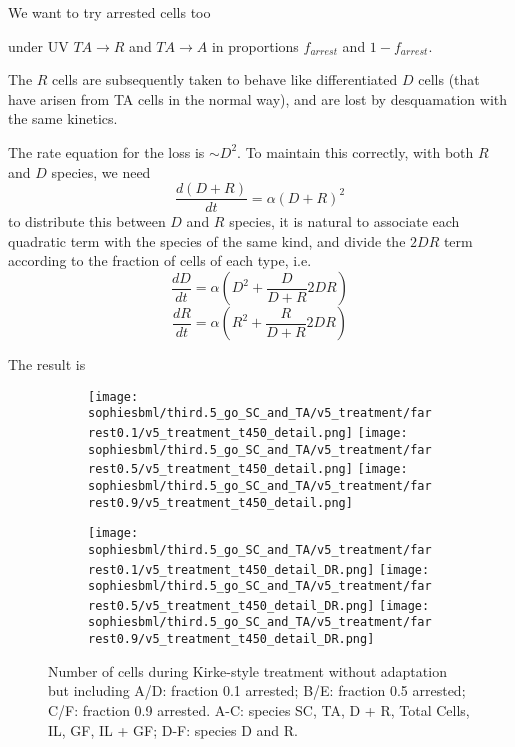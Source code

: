 \documentclass[a4paper,10pt]{report}
\newcommand{\psortbase}{/home/ngrs2/work/bsu/PSORT_Zuliani_Reynolds/}
\newcommand{\sbmlbase}{\psortbase/sbml-sh/}
\newcommand{\sophiesbml}{\sbmlbase/sophie_like}
\begin{document}
We want to try arrested cells too

under UV $TA \rightarrow R$ and $TA \rightarrow A$ in proportions $f_{arrest}$ and $1-f_{arrest}$.

The $R$ cells are subsequently taken to behave like differentiated $D$ cells (that have arisen from TA cells in the normal way), and are lost by desquamation with the same kinetics. 

The rate equation for the loss is $\sim D^2$. To maintain this correctly, with both $R$ and $D$ species, we need 
\[ 
\frac{d(D+R)}{dt} = \alpha (D+R)^2
\]
to distribute this between $D$ and $R$ species, it is natural to associate each quadratic term with the species of the same kind, and divide the $2DR$ term according to the fraction of cells of each type, i.e.
\[
\frac{dD}{dt} = \alpha (D^2 + \frac{D}{D+R} 2DR) 
\]
\[
\frac{dR}{dt} = \alpha (R^2 + \frac{R}{D+R} 2DR) 
\]


The result is 
\begin{figure}[h!]

  \begin{subfigure}{\textwidth}
    \subcaptionbox{}
    {\texttt{[image: \\sophiesbml/third.5\_go\_SC\_and\_TA/v5\_treatment/farrest0.1/v5\_treatment\_t450\_detail.png]}}
    \subcaptionbox{}
    {\texttt{[image: \\sophiesbml/third.5\_go\_SC\_and\_TA/v5\_treatment/farrest0.5/v5\_treatment\_t450\_detail.png]}}
    \subcaptionbox{}
    {\texttt{[image: \\sophiesbml/third.5\_go\_SC\_and\_TA/v5\_treatment/farrest0.9/v5\_treatment\_t450\_detail.png]}}
  \end{subfigure}

  \begin{subfigure}{\textwidth}
    \subcaptionbox{}
    {\texttt{[image: \\sophiesbml/third.5\_go\_SC\_and\_TA/v5\_treatment/farrest0.1/v5\_treatment\_t450\_detail\_DR.png]}}
    \subcaptionbox{}
    {\texttt{[image: \\sophiesbml/third.5\_go\_SC\_and\_TA/v5\_treatment/farrest0.5/v5\_treatment\_t450\_detail\_DR.png]}}
    \subcaptionbox{}
    {\texttt{[image: \\sophiesbml/third.5\_go\_SC\_and\_TA/v5\_treatment/farrest0.9/v5\_treatment\_t450\_detail\_DR.png]}}
  \end{subfigure}

  \caption{Number of cells during Kirke-style treatment without adaptation but including 
A/D: fraction 0.1 arrested; B/E: fraction 0.5 arrested; C/F: fraction 0.9 arrested. A-C: species SC, TA, D + R, Total Cells, IL, GF, IL + GF; D-F: species D and R.}

  \label{fig:thirdpoint5sophie_treatment_totc}
\end{figure}
\end{document}
